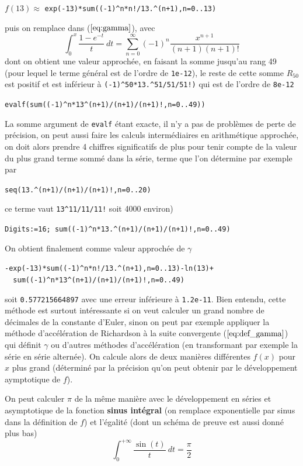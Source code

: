 \documentclass[a4paper,11pt]{book}
\begin{document}
\begin{giacjshere}
\begin{center}
$f(13) \approx$ \verb|exp(-13)*sum((-1)^n*n!/13.^(n+1),n=0..13)|
\end{center}
puis on remplace dans (\(\ref{eq:gamma}\)), avec 
\[ \int_0^{x} \frac{1-e^{-t}}{t} \ dt = 
\sum_{n=0}^{\infty} (-1)^n \frac{x^{n+1}}{(n+1) (n+1)!}\]
dont on obtient une valeur approch\'ee, 
en faisant la somme jusqu'au rang 49 (pour lequel
le terme g\'en\'eral est de l'ordre de \verb|1e-12|),
le reste de cette somme $R_{50}$ est positif et est inf\'erieur \`a
{\tt (-1)\verb|^|50*13.\verb|^|51/51/51!)} qui est de l'ordre de 
\verb|8e-12|
\begin{center}
\verb|evalf(sum((-1)^n*13^(n+1)/(n+1)/(n+1)!,n=0..49))|
\end{center}
La somme argument de \verb|evalf|
\'etant exacte, il n'y a pas de probl\`emes de perte de pr\'ecision,
on peut aussi faire les calculs interm\'ediaires en arithm\'etique approch\'ee,
on doit alors prendre 4 chiffres significatifs de plus
pour tenir compte de la valeur du plus grand terme
somm\'e dans la s\'erie, terme que l'on d\'etermine par exemple par
\begin{center}
{\tt seq(13.\verb|^|(n+1)/(n+1)/(n+1)!,n=0..20)}
\end{center} 
ce terme vaut \verb|13^11/11/11!| soit 4000 environ)
\begin{center}
\verb|Digits:=16; sum((-1)^n*13.^(n+1)/(n+1)/(n+1)!,n=0..49)|
\end{center}
On obtient finalement comme valeur approch\'ee de $\gamma$
\begin{center}
\verb|-exp(-13)*sum((-1)^n*n!/13.^(n+1),n=0..13)-ln(13)+|\\
\verb|  sum((-1)^n*13^(n+1)/(n+1)/(n+1)!,n=0..49)|
\end{center}
soit \verb|0.577215664897| avec une erreur inf\'erieure \`a \verb|1.2e-11|.
Bien entendu, cette m\'ethode est surtout int\'eressante si on veut calculer
un grand nombre de d\'ecimales de la constante d'Euler, sinon
on peut par exemple appliquer la m\'ethode d'acc\'el\'eration de Richardson \`a
la suite convergente (\(\ref{eq:def_gamma}\)) qui d\'efinit $\gamma$
ou d'autres m\'ethodes d'acc\'el\'eration (en transformant par
exemple la s\'erie en s\'erie altern\'ee). On calcule alors
de deux mani\`eres diff\'erentes $f(x)$ pour $x$ plus grand (d\'etermin\'e
par la pr\'ecision qu'on peut obtenir par le d\'eveloppement
aymptotique de $f$).

On peut calculer $\pi$ de la même manière avec le développement 
en séries et asymptotique
de la fonction {\bf sinus intégral} (on remplace exponentielle par sinus dans
la définition de $f$) et l'égalité (dont un sch\'ema de preuve est aussi
donn\'e plus bas)
\begin{equation} \label{eq:Siinf}
 \int_0^{+\infty} \frac{\sin(t)}{t} \ dt = \frac{\pi}{2}
\end{equation}


\end{giacjshere}
\end{document}
